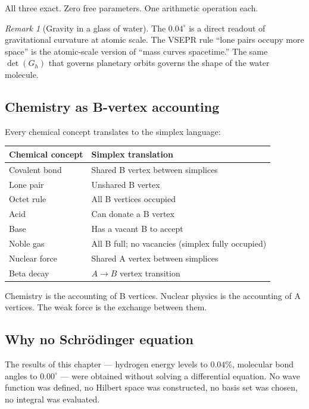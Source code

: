 \documentclass[12pt]{article}
\theoremstyle{remark}
\newtheorem{remark}[theorem]{Remark}
\theoremstyle{definition}
\begin{document}
All three exact. Zero free parameters. One arithmetic operation each.

\begin{remark}[Gravity in a glass of water]
The $0.04^\circ$ is a direct readout of gravitational curvature at atomic scale. The VSEPR rule ``lone pairs occupy more space'' is the atomic-scale version of ``mass curves spacetime.'' The same $\det(G_h)$ that governs planetary orbits governs the shape of the water molecule.
\end{remark}

\subsection{Chemistry as B-vertex accounting}

Every chemical concept translates to the simplex language:

\begin{center}
\begin{tabular}{ll}
\hline
Chemical concept & Simplex translation \\
\hline
Covalent bond & Shared B vertex between simplices \\
Lone pair & Unshared B vertex \\
Octet rule & All B vertices occupied \\
Acid & Can donate a B vertex \\
Base & Has a vacant B to accept \\
Noble gas & All B full; no vacancies (simplex fully occupied) \\
Nuclear force & Shared A vertex between simplices \\
Beta decay & $A \to B$ vertex transition \\
\hline
\end{tabular}
\end{center}

Chemistry is the accounting of B vertices. Nuclear physics is the accounting of A vertices. The weak force is the exchange between them.

\subsection{Why no Schr\"odinger equation}

The results of this chapter --- hydrogen energy levels to $0.04\%$, molecular bond angles to $0.00^\circ$ --- were obtained without solving a differential equation. No wave function was defined, no Hilbert space was constructed, no basis set was chosen, no integral was evaluated.
\end{document}
